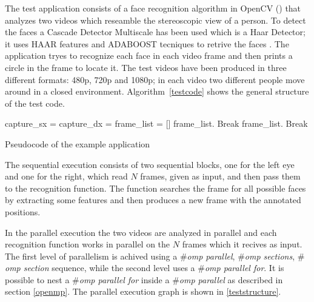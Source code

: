 \documentclass[a4paper,12pt,oneside]{book}
\begin{document}
The test application consists of a face recognition algorithm in OpenCV (\cite{opencv}\cite{openbook}) that analyzes two videos which reseamble the stereoscopic view of a person. To detect the faces a Cascade Detector Multiscale has been used which is a Haar Detector; it uses HAAR features and ADABOOST tecniques to retrive the faces \cite{cascade}. The application tryes to recognize each face in each video frame and then prints a circle in the frame to locate it.
 The test videos have been produced in three different formats: 480p, 720p and 1080p; in each video two different people move around in a closed environment.  Algorithm~\ref{testcode} shows the general structure of the test code.

\begin{algorithm}
\begin{algorithmic}

\State capture\_sx = 
\State capture\_dx = 
\State frame\_list = []
\State frame\_list.
\State Break
\EndIf
\State {}
\EndFor
\EndWhile
{}
\State frame\_list.
\State Break
\EndIf
\State {}
\EndFor
\EndWhile
\EndFunction
\end{algorithmic}
\caption{Pseudocode of the example application }
\label{testcode}
\begin{algorithmic}
\State {}
\EndFor
\EndFunction
\end{algorithmic}

\end{algorithm}

The sequential execution consists of two sequential blocks, one for the left eye and one for the right, which read $N$ frames, given as input, and then pass them to the recognition function. The function searches the frame for all possible faces by extracting some features and then produces a new frame with the annotated positions.

In the parallel execution the two videos are analyzed in parallel and each recognition function works in parallel on the $N$ frames which it recives as input. The first level of parallelism is achived using a \emph{$\#$omp parallel}, \emph{$\#$omp sections}, \emph{$\#$omp section} sequence, while the second level uses a \emph{$\#$omp parallel for}. It is possible to nest a \emph{$\#$omp parallel for }inside a \emph{$\#$omp parallel} as described in section \ref{openmp}.
The parallel execution graph is shown in \ref{teststructure}. 
\end{document}
